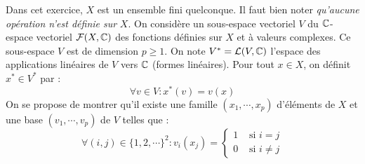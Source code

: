 Dans cet exercice, $X$ est un ensemble fini quelconque. Il faut bien noter \emph{qu'aucune opération n'est définie sur} $X$.\newline
On considère un sous-espace vectoriel $V$ du $\mathbb{C}$-espace vectoriel $\mathcal F (X,\mathbb{C})$ des fonctions définies sur $X$ et à valeurs complexes. Ce sous-espace $V$ est de dimension $p\geq 1$.\newline
On note $V^*=\mathcal L(V,\mathbb{C})$ l'espace des applications linéaires de $V$ vers $\mathbb{C}$ (formes linéaires). Pour tout $x\in X$, on définit $x^*\in V^*$ par :
\begin{displaymath}
 \forall v\in V : x^*(v) = v(x)
\end{displaymath}
On se propose de montrer qu'il existe une famille $(x_1,\cdots, x_p)$ d'éléments de $X$ et une base $(v_1,\cdots,v_p)$ de $V$ telles que :
\begin{displaymath}
 \forall (i,j)\in\{1,2,\cdots \}^2 : v_i(x_j)=
\left\lbrace 
\begin{aligned}
 1 &\text{ si } i=j \\
 0 &\text{ si } i\neq j
\end{aligned}
\right. 
\end{displaymath}

